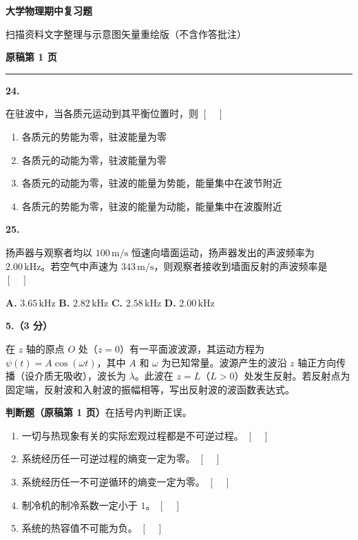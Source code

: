 \documentclass[zihao=4,a4paper,UTF8]{ctexart}
\newcommand{\qitem}[1]{
    \par
    \needspace{4\baselineskip}
    \smallskip
    \noindent
    \textbf{#1}\hspace{0.5em}\ignorespaces
}
\newcommand{\tfbox}{%
    \unskip\hspace{0.3em}\ensuremath{[\quad]}%
}
\newcommand{\sourcepage}[1]{
    \par
    \medskip
    \noindent
    {\normalsize\bfseries 原稿第 #1 页}
    \par
    \vspace{-0.2em}
    \hrule
    \smallskip
}
\begin{document}
\begin{center}
    {\Huge\bfseries 大学物理期中复习题}
    \par
    \vspace{0.3em}
    {\normalsize 扫描资料文字整理与示意图矢量重绘版（不含作答批注）}
\end{center}

\vspace{-0.45em}


\sourcepage{1}

\qitem{24.}
在驻波中，当各质元运动到其平衡位置时，则\tfbox
\begin{enumerate}[label=\Alph*.]
    \item 各质元的势能为零，驻波能量为零
    \item 各质元的动能为零，驻波能量为零
    \item 各质元的动能为零，驻波的能量为势能，能量集中在波节附近
    \item 各质元的势能为零，驻波的能量为动能，能量集中在波腹附近
\end{enumerate}

\qitem{25.}
扬声器与观察者均以 $100\,\mathrm{m/s}$ 恒速向墙面运动，扬声器发出的声波频率为 $2.00\,\mathrm{kHz}$。若空气中声速为 $343\,\mathrm{m/s}$，则观察者接收到墙面反射的声波频率是\tfbox

\noindent
\textbf{A.}\; $3.65\,\mathrm{kHz}$ \qquad
\textbf{B.}\; $2.82\,\mathrm{kHz}$ \qquad
\textbf{C.}\; $2.58\,\mathrm{kHz}$ \qquad
\textbf{D.}\; $2.00\,\mathrm{kHz}$

\qitem{5.（3 分）}
在 $z$ 轴的原点 $O$ 处（$z=0$）有一平面波波源，其运动方程为 $\psi(t)=A\cos(\omega t)$，其中 $A$ 和 $\omega$ 为已知常量。波源产生的波沿 $z$ 轴正方向传播（设介质无吸收），波长为 $\lambda$。此波在 $z=L$（$L>0$）处发生反射。若反射点为固定端，反射波和入射波的振幅相等，写出反射波的波函数表达式。

\medskip
\noindent
\textbf{判断题（原稿第 1 页）}\quad 在括号内判断正误。
\begin{enumerate}[label=\arabic*.]
    \item 一切与热现象有关的实际宏观过程都是不可逆过程。\tfbox
    \item 系统经历任一可逆过程的熵变一定为零。\tfbox
    \item 系统经历任一不可逆循环的熵变一定为零。\tfbox
    \item 制冷机的制冷系数一定小于 $1$。\tfbox
    \item 系统的热容值不可能为负。\tfbox
\end{enumerate}
\end{document}
